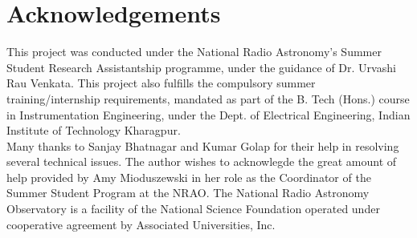 \documentclass{article}
\begin{document}
\section{Acknowledgements}
This project was conducted under the National Radio Astronomy's Summer Student Research Assistantship programme, under the guidance of Dr. Urvashi Rau Venkata. This project also fulfills the compulsory summer training/internship requirements, mandated as part of the B. Tech (Hons.) course in Instrumentation Engineering, under the Dept. of Electrical Engineering, Indian Institute of Technology Kharagpur. \\Many thanks to Sanjay Bhatnagar and Kumar Golap for their help in resolving several technical issues. The author wishes to acknowlegde the great amount of help provided by Amy Mioduszewski in her role as the Coordinator of the Summer Student Program at the NRAO. The National Radio Astronomy Observatory is a facility of the National Science
Foundation operated under cooperative agreement by Associated Universities,
Inc. 
\end{document}
